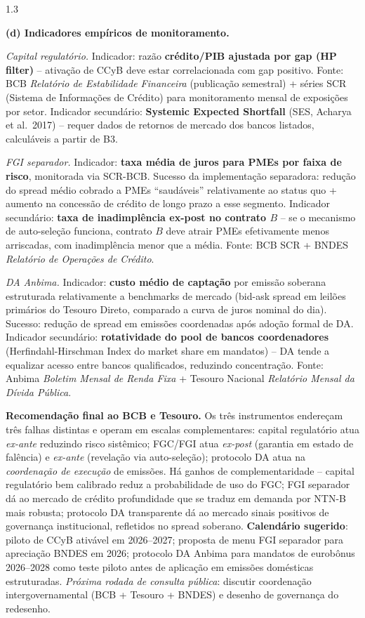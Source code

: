 \documentclass[11pt,addpoints]{exam}
\begin{document}
\begin{spacing}{1.3}
\begin{questions}
\begin{parts}
\begin{solution}
\textbf{(d) Indicadores empíricos de monitoramento.}

\emph{Capital regulatório.} Indicador: razão \textbf{crédito/PIB ajustada por gap (HP filter)} -- ativação de CCyB deve estar correlacionada com gap positivo. Fonte: BCB \emph{Relatório de Estabilidade Financeira} (publicação semestral) + séries SCR (Sistema de Informações de Crédito) para monitoramento mensal de exposições por setor. Indicador secundário: \textbf{Systemic Expected Shortfall} (SES, Acharya et al.\ 2017) -- requer dados de retornos de mercado dos bancos listados, calculáveis a partir de B3.

\emph{FGI separador.} Indicador: \textbf{taxa média de juros para PMEs por faixa de risco}, monitorada via SCR-BCB. Sucesso da implementação separadora: redução do spread médio cobrado a PMEs ``saudáveis'' relativamente ao status quo + aumento na concessão de crédito de longo prazo a esse segmento. Indicador secundário: \textbf{taxa de inadimplência ex-post no contrato $B$} -- se o mecanismo de auto-seleção funciona, contrato $B$ deve atrair PMEs efetivamente menos arriscadas, com inadimplência menor que a média. Fonte: BCB SCR + BNDES \emph{Relatório de Operações de Crédito}.

\emph{DA Anbima.} Indicador: \textbf{custo médio de captação} por emissão soberana estruturada relativamente a benchmarks de mercado (bid-ask spread em leilões primários do Tesouro Direto, comparado a curva de juros nominal do dia). Sucesso: redução de spread em emissões coordenadas após adoção formal de DA. Indicador secundário: \textbf{rotatividade do pool de bancos coordenadores} (Herfindahl-Hirschman Index do market share em mandatos) -- DA tende a equalizar acesso entre bancos qualificados, reduzindo concentração. Fonte: Anbima \emph{Boletim Mensal de Renda Fixa} + Tesouro Nacional \emph{Relatório Mensal da Dívida Pública}.

\medskip
\textbf{Recomendação final ao BCB e Tesouro.} Os três instrumentos endereçam três falhas distintas e operam em escalas complementares: capital regulatório atua \emph{ex-ante} reduzindo risco sistêmico; FGC/FGI atua \emph{ex-post} (garantia em estado de falência) e \emph{ex-ante} (revelação via auto-seleção); protocolo DA atua na \emph{coordenação de execução} de emissões. Há ganhos de complementaridade -- capital regulatório bem calibrado reduz a probabilidade de uso do FGC; FGI separador dá ao mercado de crédito profundidade que se traduz em demanda por NTN-B mais robusta; protocolo DA transparente dá ao mercado sinais positivos de governança institucional, refletidos no spread soberano. \textbf{Calendário sugerido}: piloto de CCyB ativável em 2026--2027; proposta de menu FGI separador para apreciação BNDES em 2026; protocolo DA Anbima para mandatos de eurobônus 2026--2028 como teste piloto antes de aplicação em emissões domésticas estruturadas. \emph{Próxima rodada de consulta pública}: discutir coordenação intergovernamental (BCB + Tesouro + BNDES) e desenho de governança do redesenho.
\end{solution}


\end{parts}
\end{questions}
\end{spacing}
\end{document}

